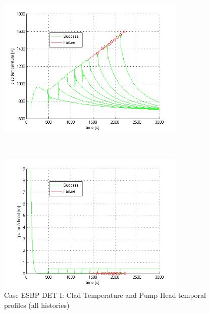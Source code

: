 \begin{figure}
 \begin{minipage}[b]{8.5cm}
   \centering
   \includegraphics[width=9cm]{figures/DETpbClad.png}
 \end{minipage}
 \ \hspace{2mm} \hspace{3mm} \
 \begin{minipage}[b]{8.5cm}
   \centering
   \includegraphics[width=9cm]{figures/DETpbHead.png}
 \end{minipage}
\caption{Case ESBP DET I: Clad Temperature and Pump Head temporal profiles (all histories)}
\label{fig:ESBPall}
\end{figure}
\vspace{-5mm}

